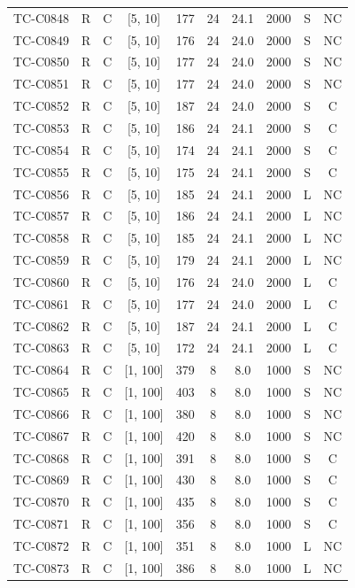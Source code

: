 \begin{longtable}{lccccccccc}
TC-C0848 & R & C & [5, 10] & 177 & 24 & 24.1 & 2000 & S & NC \\
TC-C0849 & R & C & [5, 10] & 176 & 24 & 24.0 & 2000 & S & NC \\
TC-C0850 & R & C & [5, 10] & 177 & 24 & 24.0 & 2000 & S & NC \\
TC-C0851 & R & C & [5, 10] & 177 & 24 & 24.0 & 2000 & S & NC \\
TC-C0852 & R & C & [5, 10] & 187 & 24 & 24.0 & 2000 & S & C \\
TC-C0853 & R & C & [5, 10] & 186 & 24 & 24.1 & 2000 & S & C \\
TC-C0854 & R & C & [5, 10] & 174 & 24 & 24.1 & 2000 & S & C \\
TC-C0855 & R & C & [5, 10] & 175 & 24 & 24.1 & 2000 & S & C \\
TC-C0856 & R & C & [5, 10] & 185 & 24 & 24.1 & 2000 & L & NC \\
TC-C0857 & R & C & [5, 10] & 186 & 24 & 24.1 & 2000 & L & NC \\
TC-C0858 & R & C & [5, 10] & 185 & 24 & 24.1 & 2000 & L & NC \\
TC-C0859 & R & C & [5, 10] & 179 & 24 & 24.1 & 2000 & L & NC \\
TC-C0860 & R & C & [5, 10] & 176 & 24 & 24.0 & 2000 & L & C \\
TC-C0861 & R & C & [5, 10] & 177 & 24 & 24.0 & 2000 & L & C \\
TC-C0862 & R & C & [5, 10] & 187 & 24 & 24.1 & 2000 & L & C \\
TC-C0863 & R & C & [5, 10] & 172 & 24 & 24.1 & 2000 & L & C \\
TC-C0864 & R & C & [1, 100] & 379 & 8 & 8.0 & 1000 & S & NC \\
TC-C0865 & R & C & [1, 100] & 403 & 8 & 8.0 & 1000 & S & NC \\
TC-C0866 & R & C & [1, 100] & 380 & 8 & 8.0 & 1000 & S & NC \\
TC-C0867 & R & C & [1, 100] & 420 & 8 & 8.0 & 1000 & S & NC \\
TC-C0868 & R & C & [1, 100] & 391 & 8 & 8.0 & 1000 & S & C \\
TC-C0869 & R & C & [1, 100] & 430 & 8 & 8.0 & 1000 & S & C \\
TC-C0870 & R & C & [1, 100] & 435 & 8 & 8.0 & 1000 & S & C \\
TC-C0871 & R & C & [1, 100] & 356 & 8 & 8.0 & 1000 & S & C \\
TC-C0872 & R & C & [1, 100] & 351 & 8 & 8.0 & 1000 & L & NC \\
TC-C0873 & R & C & [1, 100] & 386 & 8 & 8.0 & 1000 & L & NC \\

\end{longtable}
